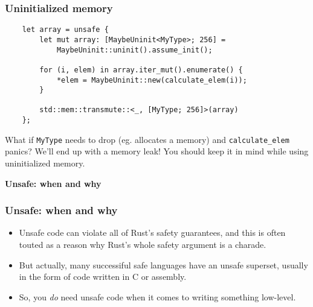 \documentclass[aspectratio=1610,t]{beamer}
\begin{document}

\begin{frame}[fragile]
\frametitle{Uninitialized memory}
\begin{verbatim}
    let array = unsafe {
        let mut array: [MaybeUninit<MyType>; 256] =
            MaybeUninit::uninit().assume_init();

        for (i, elem) in array.iter_mut().enumerate() {
            *elem = MaybeUninit::new(calculate_elem(i));
        }

        std::mem::transmute::<_, [MyType; 256]>(array)
    };
\end{verbatim}

What if \texttt{MyType} needs to drop (eg. allocates a memory) and \texttt{calculate\_elem} panics? We'll end up with a memory leak! You should keep it in mind while using uninitialized memory.
\end{frame}


\begin{frame}[c]
\centering\Huge\textbf{Unsafe: when and why}
\end{frame}


\begin{frame}[fragile]
\frametitle{Unsafe: when and why}
\begin{itemize}
    \item<1-> Unsafe code can violate all of Rust's safety guarantees, and this is often touted as a reason why Rust's whole safety argument is a charade.
    \item<2-> But actually, many successiful safe languages have an unsafe superset, usually in the form of code written in C or assembly.
    \item<3-> So, you \textit{do} need unsafe code when it comes to writing something low-level.
\end{itemize}
\end{frame}

\end{document}
